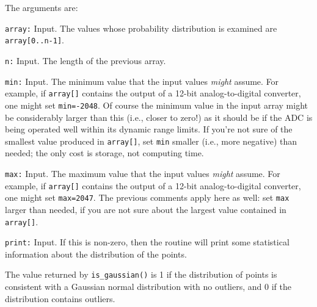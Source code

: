 The arguments are:
\begin{description}
\item{\tt array:} Input.  The values whose probability distribution is
   examined are {\tt array[0..n-1]}.
\item{\tt n:} Input.  The length of the previous array.
\item{\tt min:} Input.  The minimum value that the input values {\it might}
   assume.  For example, if {\tt array[]} contains the output of a
   12-bit analog-to-digital converter, one might set {\tt min=-2048}.
   Of course the minimum value in the input array might be considerably
   larger than this (i.e., closer to zero!) as it should be if the ADC
   is being operated well within its dynamic range limits.  If you're not sure
   of the smallest value produced in {\tt array[]}, set {\tt min} smaller
   (i.e., more negative) than needed; the only cost is storage, not computing time.
\item{\tt max:} Input.  The maximum value that the input values {\it might}
   assume.  For example, if {\tt array[]} contains the output of a 
   12-bit analog-to-digital converter, one might set {\tt max=2047}.
   The previous comments apply here as well: set {\tt max} larger than
   needed, if you are not sure about the largest value contained in {\tt array[]}.
\item{\tt print:} Input.  If this is non-zero, then the routine will print
   some statistical information about the distribution of the points.
\end{description}

The value returned by {\tt is\_gaussian()} is 1 if the distribution of
points is consistent with a Gaussian normal distribution with no
outliers, and 0 if the distribution contains outliers.

